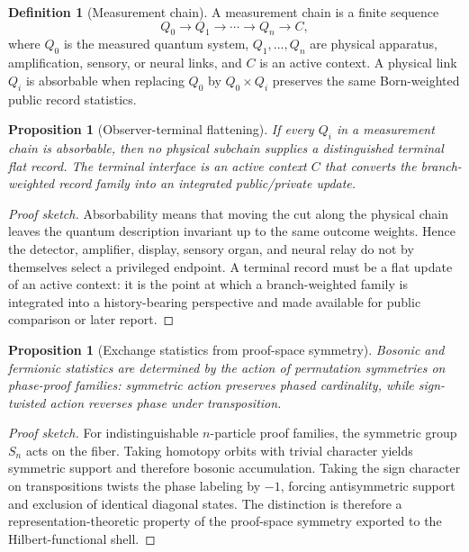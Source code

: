 \documentclass[11pt]{article}
\theoremstyle{plain}
\newtheorem{proposition}[theorem]{Proposition}
\theoremstyle{definition}
\newtheorem{definition}[theorem]{Definition}
\theoremstyle{remark}
\newenvironment{proofsketch}{\begin{proof}[Proof sketch]}{\end{proof}}
\begin{document}
\begin{definition}[Measurement chain]
A measurement chain is a finite sequence
\[
Q_0\to Q_1\to\cdots\to Q_n\to C,
\]
where \(Q_0\) is the measured quantum system, \(Q_1,\ldots,Q_n\) are physical apparatus, amplification, sensory, or neural links, and \(C\) is an active context. A physical link \(Q_i\) is absorbable when replacing \(Q_0\) by \(Q_0\times Q_i\) preserves the same Born-weighted public record statistics.
\end{definition}

\begin{proposition}[Observer-terminal flattening]
If every \(Q_i\) in a measurement chain is absorbable, then no physical subchain supplies a distinguished terminal flat record. The terminal interface is an active context \(C\) that converts the branch-weighted record family into an integrated public/private update.
\end{proposition}

\begin{proofsketch}
Absorbability means that moving the cut along the physical chain leaves the quantum description invariant up to the same outcome weights. Hence the detector, amplifier, display, sensory organ, and neural relay do not by themselves select a privileged endpoint. A terminal record must be a flat update of an active context: it is the point at which a branch-weighted family is integrated into a history-bearing perspective and made available for public comparison or later report.
\end{proofsketch}

\begin{proposition}[Exchange statistics from proof-space symmetry]
Bosonic and fermionic statistics are determined by the action of permutation symmetries on phase-proof families: symmetric action preserves phased cardinality, while sign-twisted action reverses phase under transposition.
\end{proposition}

\begin{proofsketch}
For indistinguishable \(n\)-particle proof families, the symmetric group \(S_n\) acts on the fiber. Taking homotopy orbits with trivial character yields symmetric support and therefore bosonic accumulation. Taking the sign character on transpositions twists the phase labeling by \(-1\), forcing antisymmetric support and exclusion of identical diagonal states. The distinction is therefore a representation-theoretic property of the proof-space symmetry exported to the Hilbert-functional shell.
\end{proofsketch}
\end{document}
